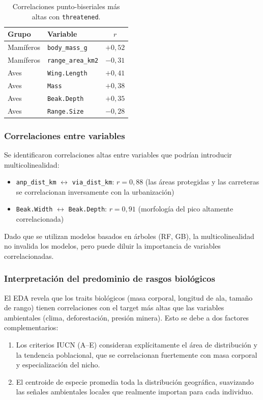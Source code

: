 \documentclass[12pt,a4paper]{article}
\begin{document}
\begin{table}[H]
  \centering
  \caption{Correlaciones punto-biseriales más altas con \texttt{threatened}.}
  \label{tab:correlaciones}
  \begin{tabular}{llc}
    \toprule
    \textbf{Grupo} & \textbf{Variable} & \textbf{$r$} \\
    \midrule
    Mamíferos & \texttt{body\_mass\_g}    & $+0{,}52$ \\
    Mamíferos & \texttt{range\_area\_km2} & $-0{,}31$ \\
    Aves      & \texttt{Wing.Length}      & $+0{,}41$ \\
    Aves      & \texttt{Mass}             & $+0{,}38$ \\
    Aves      & \texttt{Beak.Depth}       & $+0{,}35$ \\
    Aves      & \texttt{Range.Size}       & $-0{,}28$ \\
    \bottomrule
  \end{tabular}
\end{table}

\subsubsection{Correlaciones entre variables}

Se identificaron correlaciones altas entre variables que podrían introducir multicolinealidad:
\begin{itemize}[nosep]
  \item \texttt{anp\_dist\_km} $\leftrightarrow$ \texttt{via\_dist\_km}: $r = 0{,}88$
        (las áreas protegidas y las carreteras se correlacionan inversamente con la urbanización)
  \item \texttt{Beak.Width} $\leftrightarrow$ \texttt{Beak.Depth}: $r = 0{,}91$
        (morfología del pico altamente correlacionada)
\end{itemize}
Dado que se utilizan modelos basados en árboles (RF, GB), la multicolinealidad no invalida
los modelos, pero puede diluir la importancia de variables correlacionadas.

\subsubsection{Interpretación del predominio de rasgos biológicos}

El EDA revela que los traits biológicos (masa corporal, longitud de ala, tamaño de rango)
tienen correlaciones con el target más altas que las variables ambientales (clima, deforestación,
presión minera).
Esto se debe a dos factores complementarios:
\begin{enumerate}[nosep]
  \item Los criterios IUCN (A--E) consideran explícitamente el área de distribución y la
        tendencia poblacional, que se correlacionan fuertemente con masa corporal y
        especialización del nicho.
  \item El centroide de especie promedia toda la distribución geográfica, suavizando las
        señales ambientales locales que realmente importan para cada individuo.
\end{enumerate}
\end{document}

